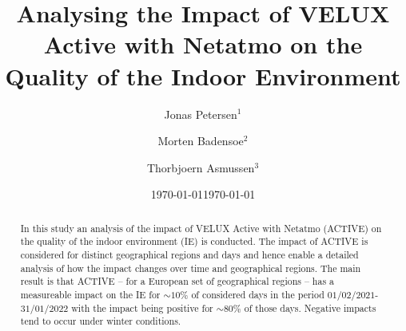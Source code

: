 \documentclass[fleqn,usenatbib,nofootinbib]{revtex4-2}
\begin{document}
	\label{firstpage}
	\title[Analysing the Impact of ACTIVE]{Analysing the Impact of VELUX Active with Netatmo on the Quality of the Indoor Environment}
	
	
	
	\author{Jonas Petersen$^{1}$}
	\author{Morten Badensoe$^{2}$}
	\author{Thorbjoern Asmussen$^{3}$}
	
	
	
	\date{\today}
	
	
	\date{\today} %
	
	\begin{abstract}
		In this study an analysis of the impact of VELUX Active with Netatmo (ACTIVE) on the quality of the indoor environment (IE) is conducted. The impact of ACTIVE is considered for distinct geographical regions and days and hence enable a detailed analysis of how the impact changes over time and geographical regions. The main result is that ACTIVE -- for a European set of geographical regions -- has a measureable impact on the IE for $\sim 10\%$ of considered days in the period $01/02/2021$-$31/01/2022$ with the impact being positive for $ \sim 80\%$ of those days. Negative impacts tend to occur under winter conditions. 
	\end{abstract}
	
	
	\maketitle
	
\end{document}
